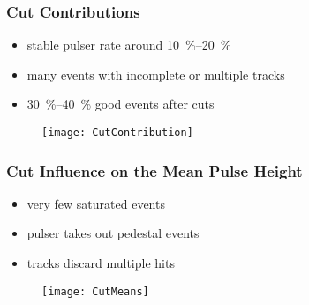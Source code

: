 \begin{frame}
	\frametitle{Cut Contributions}
	\begin{minipage}{4cm}
		\begin{itemize}
			\item stable pulser rate around \SIrange{10}{20}{\%}
			\item many events with incomplete or multiple tracks
			\item \SIrange{30}{40}{\%} good events after cuts
		\end{itemize}
	\end{minipage}
	\begin{minipage}{8cm}
		\begin{figure}
			\centering
			\texttt{[image: CutContribution]}
		\end{figure}
	\end{minipage}
\end{frame}
\begin{frame}
	\frametitle{Cut Influence on the Mean Pulse Height}
	\begin{minipage}{4cm}
		\begin{itemize}
			\item very few saturated events
			\item pulser takes out pedestal events
			\item tracks discard multiple hits
		\end{itemize}
	\end{minipage}
	\begin{minipage}{8cm}
		\begin{figure}
			\centering
			\texttt{[image: CutMeans]}
		\end{figure}
	\end{minipage}
\end{frame}

